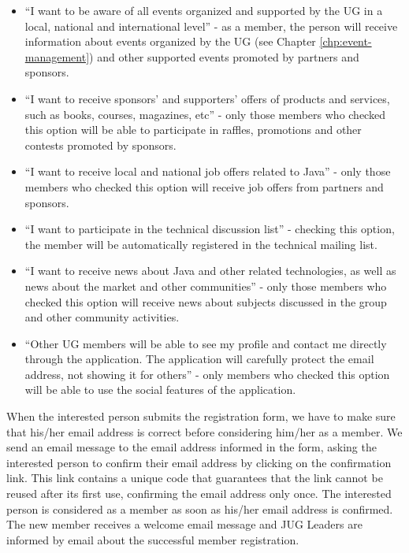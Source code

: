 \documentclass[envcountsame,envcountchap]{svmono}
\begin{document}
\begin{itemize}
\item ``I want to be aware of all events organized and supported by the UG in a local, national and international level'' - as a member, the person will receive information about events organized by the UG (see Chapter \ref{chp:event-management}) and other supported events promoted by partners and sponsors.

\item ``I want to receive sponsors' and supporters' offers of products and services, such as books, courses, magazines, etc'' - only those members who checked this option will be able to participate in raffles, promotions and other contests promoted by sponsors.

\item ``I want to receive local and national job offers related to Java'' - only those members who checked this option will receive job offers from partners and sponsors.

\item ``I want to participate in the technical discussion list'' - checking this option, the member will be automatically registered in the technical mailing list.

\item ``I want to receive news about Java and other related technologies, as well as news about the market and other communities'' - only those members who checked this option will receive news about subjects discussed in the group and other community activities.

\item ``Other UG members will be able to see my profile and contact me directly through the application. The application will carefully protect the email address, not showing it for others'' - only members who checked this option will be able to use the social features of the application.
\end{itemize}

When the interested person submits the registration form, we have to make sure that his/her email address is correct before considering him/her as a member. We send an email message to the email address informed in the form, asking the interested person to confirm their email address by clicking on the confirmation link. This link contains a unique code that guarantees that the link cannot be reused after its first use, confirming the email address only once. The interested person is considered as a member as soon as his/her email address is confirmed. The new member receives a welcome email message and JUG Leaders are informed by email about the successful member registration.
\end{document}
